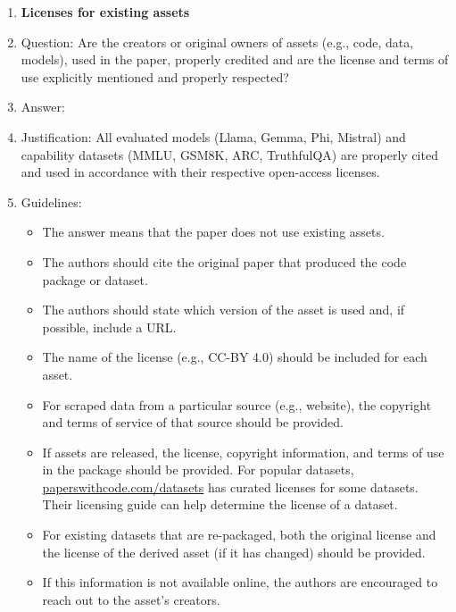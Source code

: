 \documentclass{article}
\begin{document}
\begin{enumerate}
\item {\bf Licenses for existing assets}
    \item[] Question: Are the creators or original owners of assets (e.g., code, data, models), used in the paper, properly credited and are the license and terms of use explicitly mentioned and properly respected?
    \item[] Answer: \answerYes{}
    \item[] Justification: All evaluated models (Llama, Gemma, Phi, Mistral) and capability datasets (MMLU, GSM8K, ARC, TruthfulQA) are properly cited and used in accordance with their respective open-access licenses.
    \item[] Guidelines:
    \begin{itemize}
        \item The answer \answerNA{} means that the paper does not use existing assets.
        \item The authors should cite the original paper that produced the code package or dataset.
        \item The authors should state which version of the asset is used and, if possible, include a URL.
        \item The name of the license (e.g., CC-BY 4.0) should be included for each asset.
        \item For scraped data from a particular source (e.g., website), the copyright and terms of service of that source should be provided.
        \item If assets are released, the license, copyright information, and terms of use in the package should be provided. For popular datasets, \url{paperswithcode.com/datasets} has curated licenses for some datasets. Their licensing guide can help determine the license of a dataset.
        \item For existing datasets that are re-packaged, both the original license and the license of the derived asset (if it has changed) should be provided.
        \item If this information is not available online, the authors are encouraged to reach out to the asset's creators.
    \end{itemize}


\end{enumerate}
\end{document}
